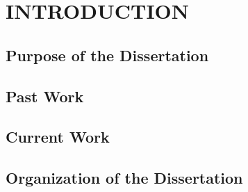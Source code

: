 %
%
%
\pagestyle{plain} %
\setcounter{page}{1}

\chapter{\uppercase {Introduction}}
\label{sec::Intro}


\section{Purpose of the Dissertation}
\label{sec::Intro_Purpose}


\section{Past Work}
\label{sec::Intro_Past}


\section{Current Work}
\label{sec::Intro_Current}

\section{Organization of the Dissertation}
\label{sec::Intro_Organization}